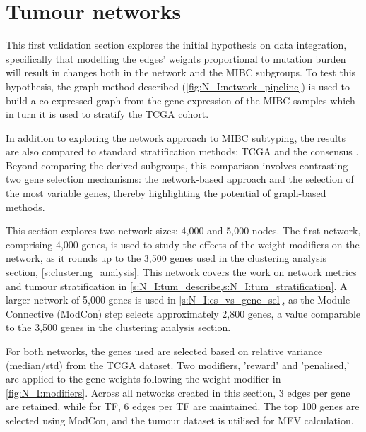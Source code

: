 \section{Tumour networks} \label{s:N_I:tum}


This first validation section explores the initial hypothesis on data integration, specifically that modelling the edges' weights proportional to mutation burden will result in changes both in the network and the MIBC subgroups. To test this hypothesis, the graph method described (\cref{fig:N_I:network_pipeline}) is used to build a co-expressed graph from the gene expression of the MIBC samples which in turn it is used to stratify the TCGA cohort.

In addition to exploring the network approach to MIBC subtyping, the results are also compared to standard stratification methods: TCGA \citep{Robertson2017-mg} and the consensus \citep{Kamoun2020-tj}. Beyond comparing the derived subgroups, this comparison involves contrasting two gene selection mechanisms: the network-based approach and the selection of the most variable genes, thereby highlighting the potential of graph-based methods.

This section explores two network sizes: 4,000 and 5,000 nodes. The first network, comprising 4,000 genes, is used to study the effects of the weight modifiers on the network, as it rounds up to the 3,500 genes used in the clustering analysis section, \cref{s:clustering_analysis}. This network covers the work on network metrics and tumour stratification in \cref{s:N_I:tum_describe,s:N_I:tum_stratification}. A larger network of 5,000 genes is used in \cref{s:N_I:cs_vs_gene_sel}, as the Module Connective (ModCon) step selects approximately 2,800 genes, a value comparable to the 3,500 genes in the clustering analysis section.

For both networks, the genes used are selected based on relative variance (median/std) from the TCGA dataset. Two modifiers, 'reward' and 'penalised,' are applied to the gene weights following the weight modifier in \cref{fig:N_I:modifiers}. Across all networks created in this section, 3 edges per gene are retained, while for TF, 6 edges per TF are maintained. The top 100 genes are selected using ModCon, and the tumour dataset is utilised for MEV calculation.


